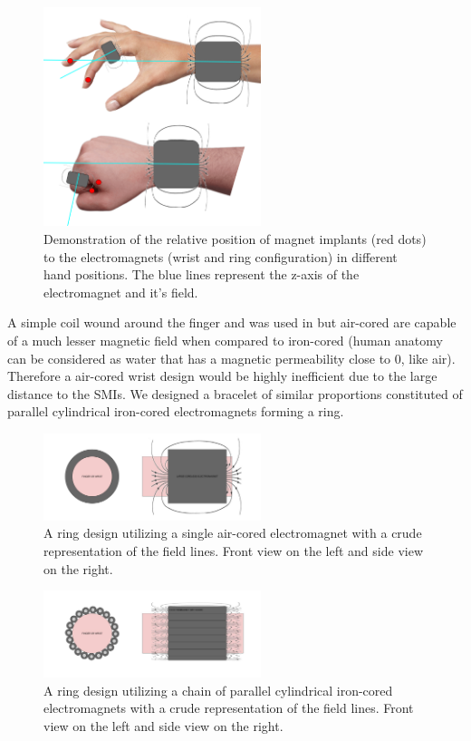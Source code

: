 \documentclass[10pt,journal,compsoc]{IEEEtran}
\begin{document}
	\begin{figure}[!t]
		\centering
		\includegraphics[width=2.5in]{RelativeImplantPosition}
		\caption{Demonstration of the relative position of magnet implants (red dots) to the electromagnets (wrist and ring configuration) in different hand positions. The blue lines represent the z-axis of the electromagnet and it's field.}
		\label{RelativeImplantPosition}
	\end{figure}
	
	A simple coil wound around the finger and was used in \cite{hameed2010ieee} but air-cored are capable of a much lesser magnetic field when compared to iron-cored (human anatomy can be considered as water that has a magnetic permeability close to 0, like air). Therefore a air-cored wrist design would be highly inefficient due to the large distance to the SMIs. We designed a bracelet of similar proportions constituted of parallel cylindrical iron-cored electromagnets forming a ring. 
	
	\begin{figure}[!t]
		\centering
		\includegraphics[width=2.5in]{AirCoredConfiguration}
		\caption{A ring design utilizing a single air-cored electromagnet with a crude representation of the field lines. Front view on the left and side view on the right.}
		\label{AirCoredConfiguration}
	\end{figure}
	
	\begin{figure}[!t]
		\centering
		\includegraphics[width=2.5in]{CoredConfiguration}
		\caption{A ring design utilizing a chain of parallel cylindrical iron-cored electromagnets with a crude representation of the field lines. Front view on the left and side view on the right.}
		\label{CoredConfiguration}
	\end{figure}
	
\end{document}
